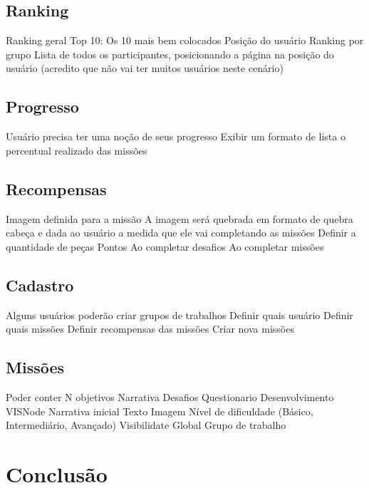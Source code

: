 \documentclass[
	12pt,				%
	oneside,			%
	a4paper,			%
	english,			%
	french,				%
	spanish,			%
	brazil,				%
	]{abntex2}
\begin{document}
\section{Ranking}

Ranking geral
Top 10: Os 10 mais bem colocados 
Posição do usuário
Ranking por grupo
Lista de todos os participantes, posicionando a página na posição do usuário (acredito que não vai ter muitos usuários neste cenário) 

\section{Progresso}

Usuário precisa ter uma noção de seus progresso
Exibir um formato de lista o percentual realizado das missões 

\section{Recompensas}

Imagem definida para a missão
A imagem será quebrada em formato de quebra cabeça e dada ao usuário a medida que ele vai completando as missões
Definir a quantidade de peças
Pontos
Ao completar desafios
Ao completar missões


\section{Cadastro}


Alguns usuários poderão criar grupos de trabalhos
Definir quais usuário
Definir quais missões
Definir recompensas das missões
Criar nova missões

\section{Missões}

Poder conter N objetivos
Narrativa
Desafios
Questionario
Desenvolvimento VISNode
Narrativa inicial
Texto
Imagem
Nível de dificuldade (Básico, Intermediário, Avançado)
Visibilidate
Global
Grupo de trabalho


% 

\chapter*[Conclusão]{Conclusão}
\end{document}
